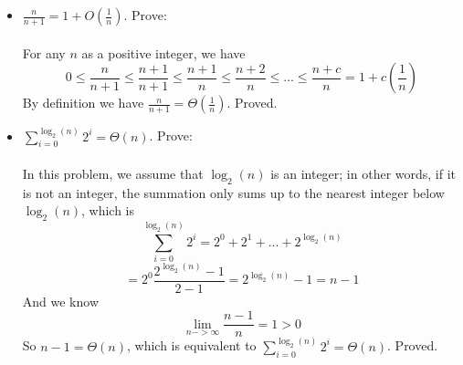 \begin{itemize}
\item $\frac{n}{n + 1} = 1 + O(\frac{1}{n})$. Prove: \\\\
For any $n$ as a positive integer, we have 
\[
0 \leq \frac{n}{n + 1} \leq \frac{n + 1}{n + 1} \leq \frac{n + 1}{n} \leq \frac{n + 2}{n} \leq ... \leq \frac{n + c}{n} = 1 + c(\frac{1}{n})
\]
By definition we have $\frac{n}{n + 1} = \Theta (\frac{1}{n})$. Proved. \\







\item $\sum_{i = 0}^{\log_2(n)} 2^i = \Theta(n)$. Prove:\\\\
In this problem, we assume that $\log_2(n)$ is an integer; in other words, if it is not an integer, the summation only sums up to the nearest integer below $\log_2 (n)$, which is
\[
\sum_{i = 0}^{\log_2(n)} 2^i = 2^0 + 2^1 + ... + 2^{\log_2(n)} \]
\[
= 2^0 \frac{2^{\log_2(n)} - 1}{2 - 1} = 2^{\log_2(n)} - 1 = n - 1
\] 
And we know 
\[
\lim_{n->\infty}\frac{n-1}{n} = 1 > 0
\]
So $n - 1 = \Theta(n)$, which is equivalent to $\sum_{i = 0}^{\log_2(n)} 2^i = \Theta(n) $. Proved. \\

\end{itemize}

